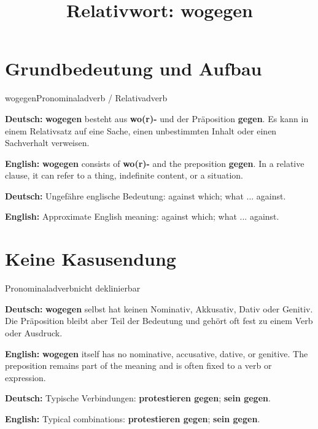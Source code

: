 \documentclass[a4paper,11pt]{article}
\title{Relativwort: \glqq wogegen\grqq{}}
\date{}
\newcommand{\GermanText}[1]{\textbf{Deutsch: }#1\par}
\newcommand{\EnglishText}[1]{{\small\color{SoftGray}\textbf{English: }#1\par}}
\begin{document}
\maketitle

\tableofcontents

\newpage

\section{Grundbedeutung und Aufbau}

\begin{grammarentry}{wogegen}{Pronominaladverb / Relativadverb}

\GermanText{\textbf{wogegen} besteht aus \textbf{wo(r)-} und der Präposition \textbf{gegen}. Es kann in einem Relativsatz auf eine Sache, einen unbestimmten Inhalt oder einen Sachverhalt verweisen.}

\EnglishText{\textbf{wogegen} consists of \textbf{wo(r)-} and the preposition \textbf{gegen}. In a relative clause, it can refer to a thing, indefinite content, or a situation.}

\GermanText{Ungefähre englische Bedeutung: \glqq against which; what ... against\grqq{}.}

\EnglishText{Approximate English meaning: \glqq against which; what ... against\grqq{}.}

\end{grammarentry}

\section{Keine Kasusendung}

\begin{grammarentry}{Pronominaladverb}{nicht deklinierbar}

\GermanText{\textbf{wogegen} selbst hat keinen Nominativ, Akkusativ, Dativ oder Genitiv. Die Präposition bleibt aber Teil der Bedeutung und gehört oft fest zu einem Verb oder Ausdruck.}

\EnglishText{\textbf{wogegen} itself has no nominative, accusative, dative, or genitive. The preposition remains part of the meaning and is often fixed to a verb or expression.}

\GermanText{Typische Verbindungen: \textbf{protestieren gegen}; \textbf{sein gegen}.}

\EnglishText{Typical combinations: \textbf{protestieren gegen}; \textbf{sein gegen}.}

\end{grammarentry}
\end{document}
